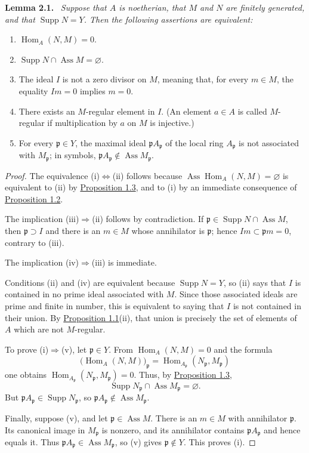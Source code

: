 \documentclass[11pt,a4paper,oneside]{book}
\providecommand{\srcpage}[1]{%
  \marginpar{\raggedright\scriptsize\color{gray}Original French p.~#1}}
\providecommand{\Ass}{\operatorname{Ass}}
\providecommand{\Supp}{\operatorname{Supp}}
\providecommand{\Homop}{\operatorname{Hom}}
\newenvironment{sgastatement}[1]
  {\par\addvspace{0.8\baselineskip}\noindent\textbf{#1.}\ \itshape}
  {\par\addvspace{0.35\baselineskip}}
\theoremstyle{plain}
\theoremstyle{definition}
\theoremstyle{remark}
\begin{document}
\begin{sgastatement}{Lemma 2.1}
Suppose that $A$ is noetherian, that $M$ and $N$ are finitely generated, and
that $\Supp N=Y$. Then the following assertions are equivalent:
\begin{enumerate}[label=\textup{(\roman*)},leftmargin=2.6em]
\item $\Homop_A(N,M)=0$.
\item $\Supp N\cap\Ass M=\varnothing$.
\item The ideal $I$ is not a zero divisor on $M$, meaning that, for every
$m\in M$, the equality $Im=0$ implies $m=0$.
\item There exists an $M$-regular element in $I$. (An element $a\in A$ is
called $M$-regular if multiplication by $a$ on $M$ is injective.)
\item For every $\mathfrak p\in Y$, the maximal ideal
$\mathfrak pA_{\mathfrak p}$ of the local ring $A_{\mathfrak p}$ is not
associated with $M_{\mathfrak p}$; in symbols,
$\mathfrak pA_{\mathfrak p}\notin\Ass M_{\mathfrak p}$.
\end{enumerate}
\end{sgastatement}

\begin{proof}
The equivalence (i)$\Leftrightarrow$(ii) follows because
$\Ass\Homop_A(N,M)=\varnothing$ is equivalent to (ii) by \hyperref[III.1.3]{Proposition 1.3},
and to (i) by an immediate consequence of \hyperref[III.1.2]{Proposition 1.2}.

The implication\srcpage{29} (iii)$\Rightarrow$(ii) follows by contradiction. If
$\mathfrak p\in\Supp N\cap\Ass M$, then $\mathfrak p\supset I$ and there
is an $m\in M$ whose annihilator is $\mathfrak p$; hence
$Im\subset\mathfrak p m=0$, contrary to (iii).

The implication (iv)$\Rightarrow$(iii) is immediate.

Conditions (ii) and (iv) are equivalent because $\Supp N=Y$, so (ii) says
that $I$ is contained in no prime ideal associated with $M$. Since those
associated ideals are prime and finite in number, this is equivalent to
saying that $I$ is not contained in their union. By \hyperref[III.1.1]{Proposition 1.1}(ii),
that union is precisely the set of elements of $A$ which are not
$M$-regular.

To prove (i)$\Rightarrow$(v), let $\mathfrak p\in Y$. From
$\Homop_A(N,M)=0$ and the formula
\[
  \bigl(\Homop_A(N,M)\bigr)_{\mathfrak p}
  =\Homop_{A_{\mathfrak p}}(N_{\mathfrak p},M_{\mathfrak p})
\]
one obtains $\Homop_{A_{\mathfrak p}}(N_{\mathfrak p},M_{\mathfrak p})=0$.
Thus, by \hyperref[III.1.3]{Proposition 1.3},
\[
  \Supp N_{\mathfrak p}\cap\Ass M_{\mathfrak p}=\varnothing.
\]
But $\mathfrak pA_{\mathfrak p}\in\Supp N_{\mathfrak p}$, so
$\mathfrak pA_{\mathfrak p}\notin\Ass M_{\mathfrak p}$.

Finally, suppose (v), and let $\mathfrak p\in\Ass M$. There is an
$m\in M$ with annihilator $\mathfrak p$. Its canonical image in
$M_{\mathfrak p}$ is nonzero, and its annihilator contains
$\mathfrak pA_{\mathfrak p}$ and hence equals it. Thus
$\mathfrak pA_{\mathfrak p}\in\Ass M_{\mathfrak p}$, so (v) gives
$\mathfrak p\notin Y$. This proves (i).
\end{proof}
\end{document}
